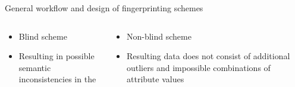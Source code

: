 \documentclass[final,hyperref={pdfpagelabels=true}]{beamer}
\begin{document}
\begin{frame}
\begin{columns}[t]
\begin{column}{.45\textwidth}
\begin{block}{General workflow and design of fingerprinting schemes}
\begin{figure}
            \end{figure}
            \begin{columns}
            \begin{column}{.5\textwidth}
            \small
            \begin{itemize}
                \item Blind scheme
                \item Resulting in possible semantic inconsistencies in the 
            \end{itemize}
            \bigskip
            \bigskip
            \end{column}
            \begin{column}{.5\textwidth}
            \small
            \begin{itemize}
                \item Non-blind scheme
                \item Resulting data does not consist of additional outliers and impossible combinations of attribute values
            \end{itemize}
            \end{column}
            \end{columns}
      \end{block}
     
    \end{column}
    

    \begin{column}{.45\textwidth}


\end{column}
\end{columns}
\end{frame}
\end{document}
